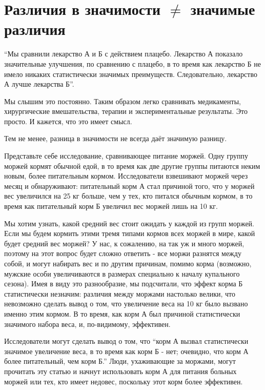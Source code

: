 \chapter{Различия в значимости $\neq$ значимые различия}
\label{chp6}

``Мы сравнили лекарство А и Б с действием плацебо. Лекарство А показало значительные улучшения, по сравнению с плацебо, в то время как лекарство Б не имело никаких статистически значимых преимуществ. Следовательно, лекарство А лучше лекарства Б''.

Мы слышим это постоянно. Таким образом легко сравнивать медикаменты, хирургические вмешательства, терапии и экспериментальные результаты. Это просто. И кажется, что это имеет смысл.

Тем не менее, разница в значимости не всегда даёт значимую разницу.\cite{gelman_difference_2006}

Представьте себе исследование, сравнивающее питание моржей. Одну группу моржей кормят обычной едой, в то время как две другие группы питаются неким новым, более питательным кормом. Исследователи взвешивают моржей через месяц и обнаруживают: питательный корм А стал причиной того, что у моржей вес увеличился на 25 кг больше, чем у тех, кто питался обычным кормом, в то время как питательный корм Б увеличил вес моржей лишь на 10 кг. 

Мы хотим узнать, какой средний вес стоит ожидать у каждой из групп моржей. Если мы будем кормить этими тремя типами кормов всех моржей в мире, какой будет средний вес моржей? У нас, к сожалению, на так уж и много моржей, поэтому на этот вопрос будет сложно ответить - все моржи разнятся между собой, и могут набирать вес и по другим причинам, помимо корма (возможно, мужские особи увеличиваются в размерах специально к началу купального сезона). Имея в виду это разнообразие, мы подсчитали, что эффект корма Б статистически незначим: различия между моржами настолько велики, что невозможно сделать вывод о том, что увеличение веса на 10 кг было вызвано именно этим кормом. В то время, как корм А был причиной статистически значимого набора веса, и, по-видимому, эффективен. 

Исследователи могут сделать вывод о том, что ``корм А вызвал статистически значимое увеличение веса, в то время как корм Б - нет; очевидно, что корм А более питательный, чем корм Б.'' Люди, ухаживающие за моржами, могут прочитать эту статью и начнут использовать корм А для питания больных моржей или тех, кто имеет недовес, поскольку этот корм более эффективен.

